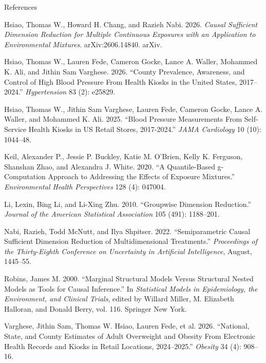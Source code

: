 \documentclass[
  ignorenonframetext,
  aspectratio=169,
  11pt]{beamer}
\newlength{\cslhangindent}
\newenvironment{CSLReferences}[2] %
 {\begin{list}{}{%
  \setlength{\itemindent}{0pt}
  \setlength{\leftmargin}{0pt}
  \setlength{\parsep}{0pt}
  \ifodd #1
   \setlength{\leftmargin}{\cslhangindent}
   \setlength{\itemindent}{-1\cslhangindent}
  \fi
  \setlength{\itemsep}{#2\baselineskip}}}
 {\end{list}}
\begin{document}
\begin{frame}[allowframebreaks]{References}
\begin{CSLReferences}{1}{1}
Hsiao, Thomas W., Howard H. Chang, and Razieh Nabi. 2026. \emph{Causal
{Sufficient Dimension Reduction} for {Multiple Continuous Exposures}
with an {Application} to {Environmental Mixtures}}. arXiv:2606.14840.
arXiv.

Hsiao, Thomas W., Lauren Fede, Cameron Gocke, Lance A. Waller, Mohammed
K. Ali, and Jithin Sam Varghese. 2026. {``County {Prevalence},
{Awareness}, and {Control} of {High Blood Pressure From Health Kiosks}
in the {United States}, 2017--2024.''} \emph{Hypertension} 83 (2):
e25829.

Hsiao, Thomas W., Jithin Sam Varghese, Lauren Fede, Cameron Gocke, Lance
A. Waller, and Mohammed K. Ali. 2025. {``Blood {Pressure Measurements
From Self-Service Health Kiosks} in {US Retail Stores}, 2017-2024.''}
\emph{JAMA Cardiology} 10 (10): 1044--48.

Keil, Alexander P., Jessie P. Buckley, Katie M. O'Brien, Kelly K.
Ferguson, Shanshan Zhao, and Alexandra J. White. 2020. {``A
{Quantile-Based} g-{Computation Approach} to {Addressing} the {Effects}
of {Exposure Mixtures}.''} \emph{Environmental Health Perspectives} 128
(4): 047004.

Li, Lexin, Bing Li, and Li-Xing Zhu. 2010. {``Groupwise {Dimension
Reduction}.''} \emph{Journal of the American Statistical Association}
105 (491): 1188--201.

Nabi, Razieh, Todd McNutt, and Ilya Shpitser. 2022. {``Semiparametric
Causal Sufficient Dimension Reduction of Multidimensional Treatments.''}
\emph{Proceedings of the {Thirty-Eighth Conference} on {Uncertainty} in
{Artificial Intelligence}}, August, 1445--55.

Robins, James M. 2000. {``Marginal {Structural Models} Versus
{Structural} Nested {Models} as {Tools} for {Causal} Inference.''} In
\emph{Statistical {Models} in {Epidemiology}, the {Environment}, and
{Clinical Trials}}, edited by Willard Miller, M. Elizabeth Halloran, and
Donald Berry, vol. 116. Springer New York.

Varghese, Jithin Sam, Thomas W. Hsiao, Lauren Fede, et al. 2026.
{``National, {State}, and {County Estimates} of {Adult Overweight} and
{Obesity From Electronic Health Records} and {Kiosks} in {Retail
Locations}, 2024--2025.''} \emph{Obesity} 34 (4): 908--16.


\end{CSLReferences}
\end{frame}
\end{document}
